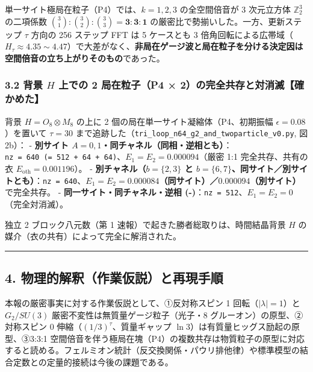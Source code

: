 \documentclass[
  a4paper,
]{ltjsarticle}
\begin{document}
単一サイト極局在粒子（P4）では、\(k = 1, 2, 3\) の全空間倍音が 3
次元立方体 \(\mathbb{Z}_2^3\) の二項係数
\(\binom{3}{1}:\binom{3}{2}:\binom{3}{3} = \mathbf{3 : 3 : 1}\)
の厳密比で勢揃いした。一方、更新ステップ \(\tau\) 方向の 256 ステップ
FFT は 5 ケースとも 3
倍角回転による広帯域（\(H_\tau \approx 4.35 \sim 4.47\)）で大差がなく、\textbf{非局在ゲージ波と局在粒子を分ける決定因は空間倍音の立ち上がりそのもの}であった。

\subsubsection{\texorpdfstring{3.2 背景 \(H\) 上での 2 局在粒子（P4 ×
2）の完全共存と対消滅【確かめた】}{3.2 背景 H 上での 2 局在粒子（P4 × 2）の完全共存と対消滅【確かめた】}}\label{ux80ccux666f-h-ux4e0aux3067ux306e-2-ux5c40ux5728ux7c92ux5b50p4-2ux306eux5b8cux5168ux5171ux5b58ux3068ux5bfeux6d88ux6ec5ux78baux304bux3081ux305f}

背景 \(H = O_8 \otimes M_8\) の上に 2
個の局在単一サイト凝縮体（P4、初期振幅 \(\epsilon = 0.08\)）を置いて
\(\tau = 30\)
まで追跡した（\texttt{tri\_\allowbreak{}loop\_\allowbreak{}n64\_\allowbreak{}g2\_\allowbreak{}and\_\allowbreak{}twoparticle\_\allowbreak{}v0.py}, 図
2b）： - \textbf{別サイト
\(A = 0, 1\)・同チャネル（同相・逆相とも）}：\texttt{nz\ =\ 640\ (=\ 512\ +\ 64\ +\ 64)}、\textbf{\(E_1 = E_2 = 0.000094\)}（厳密
1:1 完全共存、共有の衣 \(E_{\mathrm{oth}} = 0.001196\)）。 -
\textbf{別チャネル（\(b = \{2,3\}\) と
\(b = \{6,7\}\)、同サイト／別サイトとも）}：\texttt{nz\ =\ 640}、\textbf{\(E_1 = E_2 = 0.000084\)（同サイト）／\(0.000094\)（別サイト）}で完全共存。
- \textbf{同一サイト・同チャネル・逆相
(-)}：\texttt{nz\ =\ 512}、\(E_1 = E_2 = 0\)（完全対消滅）。

独立 2 ブロック八元数（第 1 速報）で起きた勝者総取りは、時間結晶背景
\(H\) の媒介（衣の共有）によって完全に解消された。

\begin{center}\rule{0.5\linewidth}{0.5pt}\end{center}

\subsection{4.
物理的解釈（作業仮説）と再現手順}\label{ux7269ux7406ux7684ux89e3ux91c8ux4f5cux696dux4eeeux8aacux3068ux518dux73feux624bux9806}

本報の厳密事実に対する作業仮説として、①反対称スピン 1
回転（\(|\lambda|=1\)）と \(G_2/SU(3)\)
厳密不変性は無質量ゲージ粒子（光子・8 グルーオン）の原型、②対称スピン 0
伸縮（\((1/3)^\tau\)、質量ギャップ
\(\ln 3\)）は有質量ヒッグス励起の原型、③3:3:1
空間倍音を伴う極局在塊（P4）の複数共存は物質粒子の原型に対応すると読める。フェルミオン統計（反交換関係・パウリ排他律）や標準模型の結合定数との定量的接続は今後の課題である。
\end{document}

